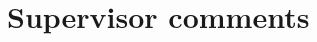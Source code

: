 \documentclass[a4paper]{report}
\begin{document}
\section{Supervisor comments}


% 
% 
\end{document}
